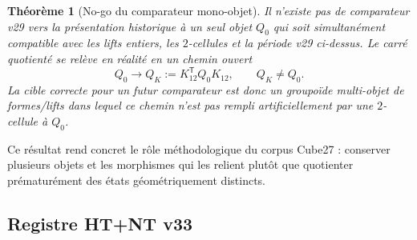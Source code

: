\documentclass[11pt,a4paper]{article}
\newtheorem{theorem}{Théorème}[section]
\begin{document}
\begin{theorem}[No-go du comparateur mono-objet]\label{thm:v33-v29-one-object-nogo}
Il n'existe pas de comparateur v29 vers la présentation historique à un seul objet $Q_0$ qui soit
simultanément compatible avec les lifts entiers, les $2$-cellules et la période v29 ci-dessus. Le
carré quotienté se relève en réalité en un chemin ouvert
\[
 Q_0\longrightarrow Q_K:=K_{12}^{\mathsf T}Q_0K_{12},
 \qquad Q_K\neq Q_0.
\]
La cible correcte pour un futur comparateur est donc un groupoïde multi-objet de formes/lifts dans
lequel ce chemin n'est pas rempli artificiellement par une $2$-cellule à $Q_0$.
\end{theorem}

Ce résultat rend concret le rôle méthodologique du corpus Cube27 : conserver plusieurs objets et les
morphismes qui les relient plutôt que quotienter prématurément des états géométriquement distincts.

\subsection{Registre HT+NT v33}
\end{document}
